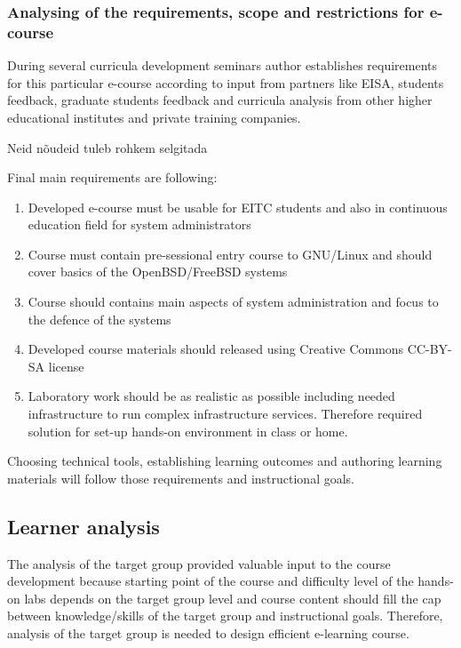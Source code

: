\subsubsection{Analysing of the requirements, scope and restrictions for e-course}
During several curricula development seminars author establishes requirements for this particular e-course according to input from partners like \gls{EISA}, students feedback, graduate students feedback and curricula analysis from other higher educational institutes and private training companies. 

{\color{red} Neid nõudeid tuleb rohkem selgitada }

Final main requirements are following:
\begin{enumerate}[label=Requirement \arabic*.,leftmargin=*]
  \item Developed e-course must be usable for \gls{EITC} students and also in continuous education field for system administrators
  \item Course must contain pre-sessional entry course to GNU/Linux and should cover basics  of the OpenBSD/FreeBSD systems
  \item Course should contains main aspects of system administration and focus to the defence of the systems
  \item Developed course materials should released using Creative Commons \gls{CC-BY-SA} license
  \item Laboratory work should be as realistic as possible including needed infrastructure to run complex infrastructure services. Therefore required solution for set-up hands-on environment in class or home.
\end{enumerate}

Choosing technical tools, establishing learning outcomes and authoring learning materials will follow those requirements and instructional goals.

\subsection{Learner analysis}


The analysis of the target group provided valuable input to the course development because starting point of the course and difficulty level of the hands-on labs depends on the target group level and course content should fill the cap between knowledge/skills of the target group and instructional goals. Therefore, analysis of the target group is needed to design efficient e-learning course.

